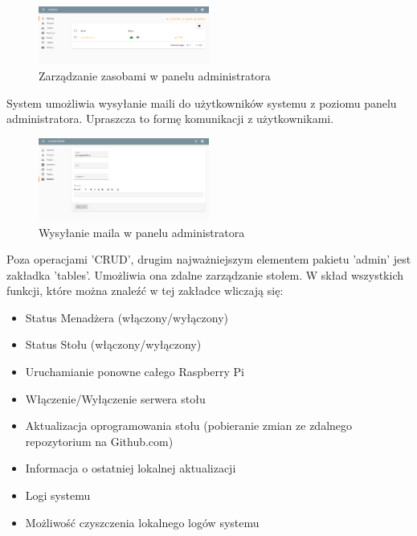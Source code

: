 \begin{figure}[h!]
  \centering
    \includegraphics[width=0.5\textwidth]{images/admin/adminsList.png}
  \caption{Zarządzanie zasobami w panelu administratora}
  \label{fig:mobile}
\end{figure}

System umożliwia wysyłanie maili do użytkowników systemu z poziomu panelu administratora. Upraszcza to formę komunikacji z użytkownikami.

\begin{figure}[h!]
  \centering
    \includegraphics[width=0.5\textwidth]{images/admin/mailer.png}
  \caption{Wysyłanie maila w panelu administratora}
  \label{fig:mobile}
\end{figure}

Poza operacjami 'CRUD', drugim najważniejszym elementem pakietu 'admin' jest zakładka 'tables'. Umożliwia ona zdalne zarządzanie stołem. W skład wszystkich funkcji, które można znaleźć w tej zakładce wliczają się:

\begin{itemize}
	\item Status Menadżera (włączony/wyłączony)
	\item Status Stołu (włączony/wyłączony)
	\item Uruchamianie ponowne całego Raspberry Pi
	\item Włączenie/Wyłączenie serwera stołu
	\item Aktualizacja oprogramowania stołu (pobieranie zmian ze zdalnego repozytorium na Github.com)
	\item Informacja o ostatniej lokalnej aktualizacji
	\item Logi systemu
	\item Możliwość czyszczenia lokalnego logów systemu
\end{itemize}

